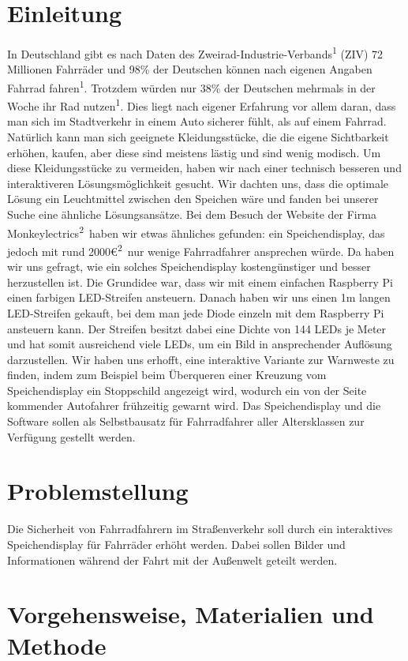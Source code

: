\documentclass [a4paper, 11pt] {article}
\begin{document}
\tableofcontents
\newpage
\section{Einleitung}
In Deutschland gibt es nach Daten des Zweirad-Industrie-Verbands\textsuperscript{1} (ZIV) 72 Millionen Fahrräder und 98\% der Deutschen können nach eigenen Angaben Fahrrad fahren\textsuperscript{1}. Trotzdem würden nur 38\% der Deutschen mehrmals in der Woche ihr Rad nutzen\textsuperscript{1}. Dies liegt nach eigener Erfahrung vor allem daran, dass man sich im Stadtverkehr in einem Auto sicherer fühlt, als auf einem Fahrrad. Natürlich kann man sich geeignete Kleidungsstücke, die die eigene Sichtbarkeit erhöhen, kaufen, aber diese sind meistens lästig und sind wenig modisch. Um diese Kleidungsstücke zu vermeiden, haben wir nach einer technisch besseren und interaktiveren Lösungsmöglichkeit gesucht. Wir dachten uns, dass die optimale Lösung ein Leuchtmittel zwischen den Speichen wäre und fanden bei unserer Suche eine ähnliche Lösungsansätze. Bei dem Besuch der Website der Firma Monkeylectrics\textsuperscript{2}\ haben wir etwas ähnliches gefunden: ein Speichendisplay, das jedoch mit rund 2000\euro\textsuperscript{2}\ nur wenige Fahrradfahrer ansprechen würde. Da haben wir uns gefragt, wie ein solches Speichendisplay kostengünstiger und besser herzustellen ist. Die Grundidee war, dass wir mit einem einfachen Raspberry Pi einen farbigen LED-Streifen ansteuern. Danach haben wir uns einen 1m langen LED-Streifen gekauft, bei dem man jede Diode einzeln mit dem Raspberry Pi ansteuern kann. Der Streifen besitzt dabei eine Dichte von 144 LEDs je Meter und hat somit ausreichend viele LEDs, um ein Bild in ansprechender Auflösung darzustellen. Wir haben uns erhofft, eine interaktive Variante zur Warnweste zu finden, indem zum Beispiel beim Überqueren einer Kreuzung vom Speichendisplay ein Stoppschild angezeigt wird, wodurch ein von der Seite kommender Autofahrer frühzeitig gewarnt wird. Das Speichendisplay und die Software sollen als Selbstbausatz für Fahrradfahrer aller Altersklassen zur Verfügung gestellt werden.
\section{Problemstellung}
Die Sicherheit von Fahrradfahrern im Straßenverkehr soll durch ein interaktives Speichendisplay für Fahrräder erhöht werden. Dabei sollen Bilder und Informationen während der Fahrt mit der Außenwelt geteilt werden.
\section{Vorgehensweise, Materialien und Methode}
\end{document}
